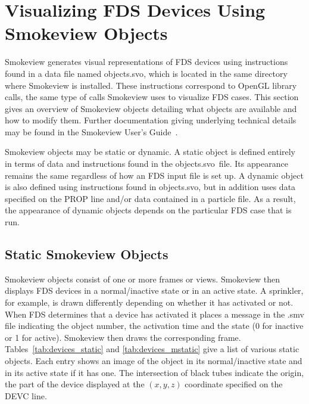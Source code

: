 %
%
\newcommand{\devicewidth}{1.5in}
\newcommand{\boxwidth}{3.0in}
\newcommand{\incgraphics}[1]{
\parbox[c]{\devicewidth}{
\vspace{0.01in}
\texttt{[image: \#1]}
\vspace{0.01in}
}
}

\section{Visualizing FDS Devices Using Smokeview Objects}

Smokeview generates visual representations of FDS devices using instructions found in a data file named
{\ct objects.svo}, which is located in the same directory where Smokeview is installed.  These instructions correspond to OpenGL library calls, the same type of calls Smokeview
uses to visualize FDS cases.  This section gives an overview
of Smokeview objects detailing what objects are available and how to modify them.  Further documentation
giving underlying technical details may be found in the Smokeview User's Guide~\cite{Smokeview_Users_Guide}.

Smokeview objects may be static or dynamic.  A static object is defined entirely in terms of data and instructions
found in the {\ct objects.svo}\ file.  Its appearance remains the same regardless of how an FDS input file is set up.  A
dynamic object is also defined using instructions found in {\ct objects.svo}, but in addition uses data specified on
the {\ct PROP}  line and/or data contained in a particle file.  As a result, the appearance of dynamic
objects depends on the particular FDS case that is run.   


\subsection{Static Smokeview Objects}
\label{info:SMOKEVIEW_ID}

Smokeview objects consist of one or more frames or views.  Smokeview then displays FDS devices in a normal/inactive
state or in an active state.  A sprinkler, for example, is drawn differently depending on whether it has activated
or not.  When FDS determines that a device has activated it places a message in the {\ct .smv} file indicating the
object number, the activation time and the state (0 for inactive or 1 for active).  Smokeview then draws the corresponding
frame.  Tables~\ref{tab:devices_static} and \ref{tab:devices_mstatic} give a list of various static objects.  Each entry shows
an image of the object in its normal/inactive state and in its active state if it has one.  The intersection of black tubes
indicate the origin, the part of the device displayed at the $(x,y,z)$ coordinate specified on the {\ct DEVC} line.

